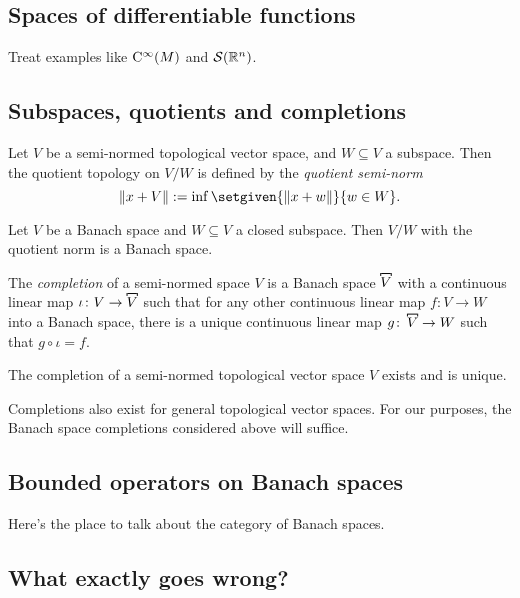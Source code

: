 \subsection{Spaces of differentiable functions}

Treat examples like \(\mathrm{C}^\infty(M)\) and \(\mathcal{S}(\mathbb R^n)\).

\subsection{Subspaces, quotients and completions}


Let \(V\) be a semi-normed topological vector space, and \(W \subseteq V\) a subspace. Then the quotient topology on \(V/W\) is defined by the \emph{quotient semi-norm} \[\norm{x + V} \defeq \inf \setgiven{\norm{x+ w}}{w \in W}.\]

\begin{theorem}
Let \(V\) be a Banach space and \(W \subseteq V\) a closed subspace. Then \(V/W\) with the quotient norm is a Banach space. 
\end{theorem}


\begin{definition}\label{def:completion}
The \emph{completion} of a semi-normed space \(V\) is a Banach space \(\comb{V}\) with a continuous linear map \(\iota \colon V \to \comb{V}\) such that for any other continuous linear map \(f \colon V \to W\) into a Banach space, there is a unique continuous linear map \(g \colon \comb{V} \to W\) such that \(g \circ \iota = f\). 
\end{definition}


\begin{theorem}
The completion of a semi-normed topological vector space \(V\) exists and is unique. 
\end{theorem}


Completions also exist for general topological vector spaces. For our purposes, the Banach space completions considered above will suffice. 

\subsection{Bounded operators on Banach spaces}

Here's the place to talk about the category of Banach spaces.

\subsection{What exactly goes wrong?}


